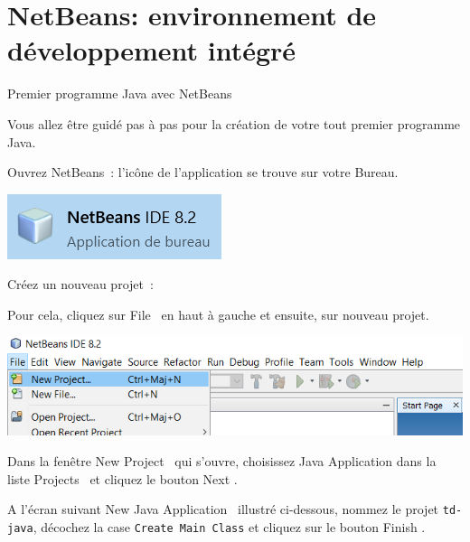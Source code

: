 \documentclass[a4paper,11pt]{style-esi/td}
\begin{document}

\section{NetBeans: environnement de développement intégré }

\begin{Tutoriel}{Premier programme Java avec NetBeans}

	Vous allez être guidé pas à pas pour la création de votre tout premier programme Java.

	\begin{steps}
		\item Ouvrez NetBeans~:
		l'icône de l'application se trouve sur votre Bureau.

		\bigskip
		\begin{center}
			\includegraphics{images/nb_icone}
		\end{center}


		\item Créez un nouveau projet~:

		Pour cela, cliquez sur \og File \fg~en haut à gauche et ensuite, sur nouveau projet.

		\bigskip
		\begin{center}
			\includegraphics[width=.9\textwidth]{images/nb_newproject}
		\end{center}

		Dans la fenêtre \og New Project \fg~qui s'ouvre, choisissez \og Java Application \fg dans la liste \og Projects \fg~et cliquez le bouton \og Next \fg.

		A l'écran suivant \og New Java Application \fg~illustré ci-dessous,
		nommez le projet \texttt{td-java}, décochez la case \texttt{Create Main Class} et cliquez sur le bouton \og Finish \fg.


\end{steps}
\end{Tutoriel}
\end{document}
